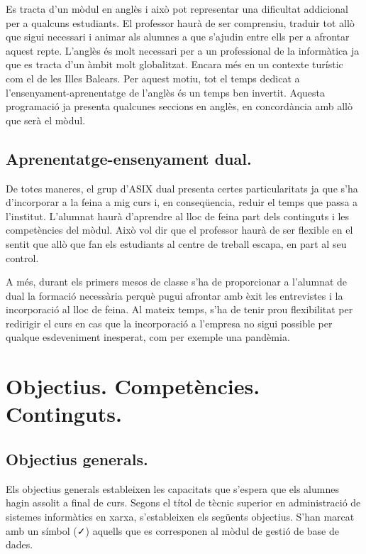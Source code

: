 \documentclass[catalan, a4paper, 12pt, titlepage]{article}
\begin{document}
Es tracta d'un mòdul en anglès i això pot representar una dificultat addicional per a qualcuns estudiants.
El professor haurà de ser comprensiu, traduir tot allò que sigui necessari i animar als alumnes a que s'ajudin entre ells per a afrontar aquest repte.
L'anglès és molt necessari per a un professional de la informàtica ja que es tracta d'un àmbit molt globalitzat.
Encara més en un contexte turístic com el de les Illes Balears.
Per aquest motiu, tot el temps dedicat a l'ensenyament-aprenentatge de l'anglès és un temps ben invertit.
Aquesta programació ja presenta qualcunes seccions en anglès, en concordància amb allò que serà el mòdul.

\subsection{Aprenentatge-ensenyament dual.}

De totes maneres, el grup d'ASIX dual presenta certes particularitats ja que s'ha d'incorporar a la feina a mig curs i, en conseqüencia, reduir el temps que passa a l'institut.
L'alumnat haurà d'aprendre al lloc de feina part dels continguts i les competències del mòdul.
Això vol dir que el professor haurà de ser flexible en el sentit que allò que fan els estudiants al centre de treball escapa, en part al seu control.

A més, durant els primers mesos de classe s'ha de proporcionar a l'alumnat de dual la formació necessària perquè pugui afrontar amb èxit les entrevistes i la incorporació al lloc de feina.
Al mateix temps, s'ha de tenir prou flexibilitat per redirigir el curs en cas que la incorporació a l'empresa no sigui possible per qualque esdeveniment inesperat, com per exemple una pandèmia.

\section{Objectius. Competències. Continguts.}
\label{sec:continguts}

\subsection{Objectius generals.}

Els objectius generals estableixen les capacitats que s'espera que els alumnes hagin assolit a final de curs. Segons el títol de tècnic superior en administració de sistemes informàtics en xarxa, s'estableixen els següents objectius. S'han marcat amb un símbol (\faCheck) aquells que es corresponen al mòdul de gestió de base de dades.
\end{document}
